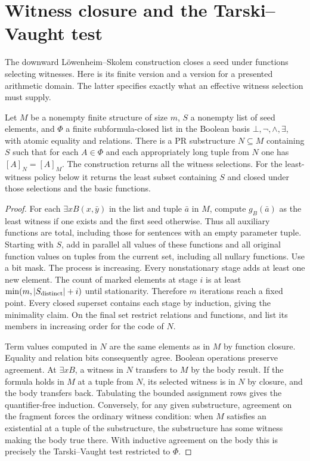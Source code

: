 \section{Witness closure and the Tarski--Vaught test}\label{sec:witnessclosure}
The downward Löwenheim--Skolem construction closes a seed under functions selecting witnesses. Here is its finite version and a version for a presented arithmetic domain. The latter specifies exactly what an effective witness selection must supply.

\begin{theorem}\label{thm:TV}
Let $M$ be a nonempty finite structure of size $m$, $S$ a nonempty list of seed elements, and $\Phi$ a finite subformula-closed list in the Boolean basis $\bot,\neg,\wedge,\exists$, with atomic equality and relations. There is a PR substructure $N\subseteq M$ containing $S$ such that for each $A\in\Phi$ and each appropriately long tuple from $N$ one has $[A]_N=[A]_M$. The construction returns all the witness selections. For the least-witness policy below it returns the least subset containing $S$ and closed under those selections and the basic functions.
\end{theorem}
\begin{proof}
For each $\exists x B(x,\bar y)$ in the list and tuple $\bar a$ in $M$, compute $g_B(\bar a)$ as the least witness if one exists and the first seed otherwise. Thus all auxiliary functions are total, including those for sentences with an empty parameter tuple. Starting with $S$, add in parallel all values of these functions and all original function values on tuples from the current set, including all nullary functions. Use a bit mask. The process is increasing. Every nonstationary stage adds at least one new element. The count of marked elements at stage $i$ is at least $\min(m,|S_{\rm distinct}|+i)$ until stationarity. Therefore $m$ iterations reach a fixed point. Every closed superset contains each stage by induction, giving the minimality claim. On the final set restrict relations and functions, and list its members in increasing order for the code of $N$.

Term values computed in $N$ are the same elements as in $M$ by function closure. Equality and relation bits consequently agree. Boolean operations preserve agreement. At $\exists x B$, a witness in $N$ transfers to $M$ by the body result. If the formula holds in $M$ at a tuple from $N$, its selected witness is in $N$ by closure, and the body transfers back. Tabulating the bounded assignment rows gives the quantifier-free induction. Conversely, for any given substructure, agreement on the fragment forces the ordinary witness condition: when $M$ satisfies an existential at a tuple of the substructure, the substructure has some witness making the body true there. With inductive agreement on the body this is precisely the Tarski--Vaught test restricted to $\Phi$.
\end{proof}

